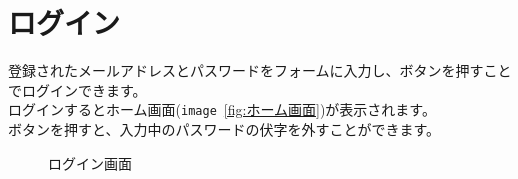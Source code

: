 \documentclass[11ptm]{jsarticle}
\begin{document}
\section{ログイン}
\label{sec:ログイン}
登録されたメールアドレスとパスワードをフォームに入力し、ボタンを押すことでログインできます。\\
ログインするとホーム画面({\tt image}\ \ref{fig:ホーム画面})が表示されます。\\
ボタンを押すと、入力中のパスワードの伏字を外すことができます。
\begin{figure}[h]
  \centering
  \begin{minipage}[h]{0.6\linewidth}
    \centering
    \caption{\label{fig:ログイン画面}ログイン画面}
  \end{minipage}
  \hfill
  \begin{minipage}[h]{0.3\linewidth}
    \centering
  \end{minipage}
\end{figure}\\
\end{document}
